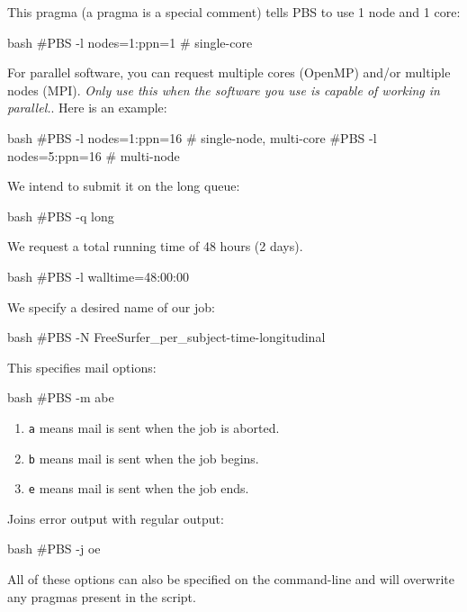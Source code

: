 This pragma (a pragma is a special comment) tells PBS to use 1 \gls{node} and 1 \gls{core}:

\begin{code}{bash}
  #PBS -l nodes=1:ppn=1   # single-core
\end{code}

For parallel software, you can request multiple cores (OpenMP) and/or multiple
nodes (\gls{MPI}). \emph{Only use this when the software you use is capable of working in
parallel.}. Here is an example:

\begin{code}{bash}
  #PBS -l nodes=1:ppn=16  # single-node, multi-core
  #PBS -l nodes=5:ppn=16  # multi-node
\end{code}

We intend to submit it on the long \gls{queue}:

\begin{code}{bash}
  #PBS -q long
\end{code}

We request a total running time of 48 hours (2 days).

\begin{code}{bash}
  #PBS -l walltime=48:00:00
\end{code}

We specify a desired name of our job:

\begin{code}{bash}
  #PBS -N FreeSurfer_per_subject-time-longitudinal
\end{code}

This specifies mail options:

\begin{code}{bash}
  #PBS -m abe
\end{code}

\begin{enumerate}
\item \lstinline|a| means mail is sent when the job is aborted.
\item \lstinline|b| means mail is sent when the job begins.
\item \lstinline|e| means mail is sent when the job ends.
\end{enumerate}

Joins error output with regular output:

\begin{code}{bash}
  #PBS -j oe
\end{code}

All of these options can also be specified on the command-line and will
overwrite any pragmas present in the script.


